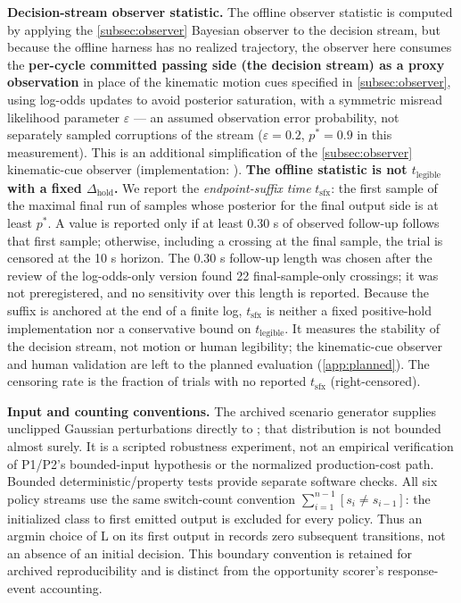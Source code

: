 \noindent\textbf{Decision-stream observer statistic.} The offline observer statistic is computed by applying the \cref{subsec:observer} Bayesian observer to the decision stream, but because the offline harness has no realized trajectory, the observer here consumes the \textbf{per-cycle committed passing side (the decision stream) as a proxy observation} in place of the kinematic motion cues specified in \cref{subsec:observer}, using log-odds updates to avoid posterior saturation, with a symmetric misread likelihood parameter $\varepsilon$ --- an assumed observation error probability, not separately sampled corruptions of the stream ($\varepsilon = 0.2$, $p^* = 0.9$ in this measurement). This is an additional simplification of the \cref{subsec:observer} kinematic-cue observer (implementation: ). \textbf{The offline statistic is not $t_{\text{legible}}$ with a fixed $\Delta_{\text{hold}}$.} We report the \emph{endpoint-suffix time} $t_{\text{sfx}}$: the first sample of the maximal final run of samples whose posterior for the final output side is at least $p^*$. A value is reported only if at least 0.30 s of observed follow-up follows that first sample; otherwise, including a crossing at the final sample, the trial is censored at the 10 s horizon. The 0.30 s follow-up length was chosen after the review of the log-odds-only version found 22 final-sample-only crossings; it was not preregistered, and no sensitivity over this length is reported. Because the suffix is anchored at the end of a finite log, $t_{\text{sfx}}$ is neither a fixed positive-hold implementation nor a conservative bound on $t_{\text{legible}}$. It measures the stability of the decision stream, not motion or human legibility; the kinematic-cue observer and human validation are left to the planned evaluation (\cref{app:planned}). The censoring rate is the fraction of trials with no reported $t_{\text{sfx}}$ (right-censored).

\noindent\textbf{Input and counting conventions.} The archived scenario generator supplies unclipped Gaussian perturbations directly to ; that distribution is not bounded almost surely. It is a scripted robustness experiment, not an empirical verification of P1/P2's bounded-input hypothesis or the normalized production-cost path. Bounded deterministic/property tests provide separate software checks. All six policy streams use the same switch-count convention $\sum_{i=1}^{n-1}[s_i\ne s_{i-1}]$: the initialized class to first emitted output is excluded for every policy. Thus an argmin choice of L on its first output in  records zero subsequent transitions, not an absence of an initial decision. This boundary convention is retained for archived reproducibility and is distinct from the opportunity scorer's response-event accounting.

